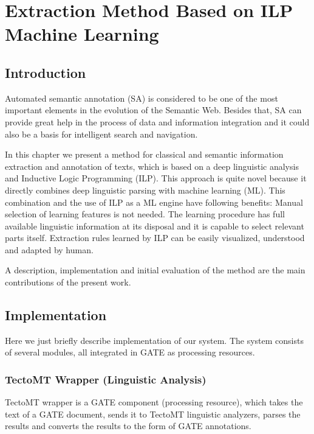 \chapter{Extraction Method Based on ILP Machine Learning} \label{ch:ILP_Learning}
\graphicspath{{../img/ch60/}}


\section{Introduction}
Automated semantic annotation (SA) is considered to be one of the most important elements in the evolution of the Semantic Web. Besides that, SA can provide great help in the process of data and information integration and it could also be a basis for intelligent search and navigation.

In this chapter we present %
a method for classical and semantic information extraction and annotation of texts, which is based on a deep linguistic analysis and Inductive Logic Programming (ILP). This approach is quite novel because it directly combines deep linguistic parsing with machine learning (ML). This combination and the use of ILP as a ML engine have following benefits: Manual selection of learning features is not needed. 
The learning procedure has full available linguistic information at its disposal and it is capable to select relevant parts itself. Extraction rules learned by ILP can be easily visualized, understood and adapted by human.

A description, implementation and initial evaluation of the method are the main contributions of the present work.









\section{Implementation}
Here we just briefly describe implementation of our system. The system consists of several modules, all integrated in GATE as processing resources.

\subsection{TectoMT Wrapper (Linguistic Analysis)} 

TectoMT wrapper is a GATE component (processing resource), which takes the text of a GATE document, sends it to TectoMT linguistic analyzers, parses the results and converts the results to the form of GATE annotations.

